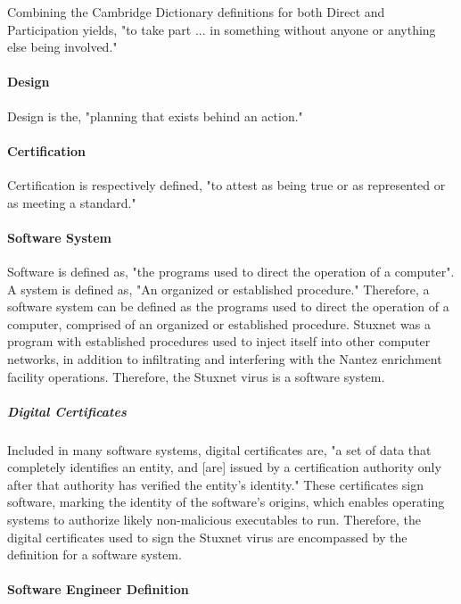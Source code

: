 \documentclass[12pt]{article}
\begin{document}
\begin{multicols}{2}
Combining the Cambridge Dictionary definitions for both Direct and Participation yields, "to take part ... in something without anyone or anything else being involved."\cite{cambridgeDictionary}

\paragraph{Design}
Design is the, "planning that exists behind an action."\cite{designDefinition}

\paragraph{Certification}
Certification is respectively defined, "to attest as being true or as represented or as meeting a standard."\cite{cambridgeDictionary}

\paragraph{Software System}

Software is defined as, "the programs used to direct the operation of a computer".\cite{softwareDefinition} A system is defined as, "An organized or established procedure."\cite{merriamWebsterDefinitions} Therefore, a software system can be defined as the programs used to direct the operation of a computer, comprised of an organized or established procedure. Stuxnet was a program with established procedures used to inject itself into other computer networks, in addition to infiltrating and interfering with the Nantez enrichment facility operations. Therefore, the Stuxnet virus is a software system.\cite{w32.stuxnetDossier}

\subparagraph{Digital Certificates}

Included in many software systems, digital certificates are, "a set of data that completely identifies an entity, and [are] issued by a certification authority only after that authority has verified the entity's identity."\cite{digitalCertificateDefintion} These certificates sign software, marking the identity of the software's origins, which enables operating systems to authorize likely non-malicious executables to run. Therefore, the digital certificates used to sign the Stuxnet virus are encompassed by the definition for a software system.

\paragraph{Software Engineer Definition}


\end{multicols}
\end{document}
